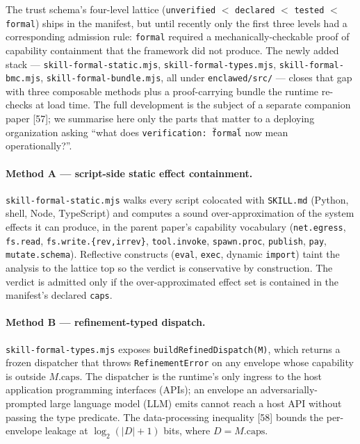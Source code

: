 \documentclass[11pt]{article}
\begin{document}
The trust schema's four-level lattice
(\texttt{unverified} $<$ \texttt{declared} $<$ \texttt{tested} $<$
\texttt{formal}) ships in the manifest, but until recently only the
first three levels had a corresponding admission rule: \texttt{formal}
required a mechanically-checkable proof of capability containment that
the framework did not produce. The newly added stack ---
\texttt{skill-formal-static.mjs},
\texttt{skill-formal-types.mjs},
\texttt{skill-formal-bmc.mjs},
\texttt{skill-formal-bundle.mjs}, all under \texttt{enclawed/src/}
--- closes that gap with three composable methods plus a
proof-carrying bundle the runtime re-checks at load time. The full development is the
subject of a separate companion paper [57]; we
summarise here only the parts that matter to a deploying organization
asking ``what does \texttt{verification: \"formal\"} now mean
operationally?''.

\paragraph{Method A --- script-side static effect containment.}
\texttt{skill-formal-static.mjs} walks every script colocated with
\texttt{SKILL.md} (Python, shell, Node, TypeScript) and computes a
sound over-approximation of the system effects it can produce, in the
parent paper's capability vocabulary
(\texttt{net.egress}, \texttt{fs.read}, \texttt{fs.write.\{rev,irrev\}},
\texttt{tool.invoke}, \texttt{spawn.proc}, \texttt{publish},
\texttt{pay}, \texttt{mutate.schema}). Reflective constructs
(\texttt{eval}, \texttt{exec}, dynamic \texttt{import}) taint the
analysis to the lattice top so the verdict is conservative by
construction. The verdict is admitted only if the over-approximated
effect set is contained in the manifest's declared \texttt{caps}.

\paragraph{Method B --- refinement-typed dispatch.}
\texttt{skill-formal-types.mjs} exposes \texttt{buildRefinedDispatch(M)},
which returns a frozen dispatcher that throws \texttt{RefinementError}
on any envelope whose capability is outside $M.\mathrm{caps}$. The
dispatcher is the runtime's only ingress to the host application
programming interfaces (APIs); an envelope an adversarially-prompted
large language model (LLM) emits cannot reach a host API without
passing the type predicate. The data-processing inequality
[58] bounds the per-envelope leakage at
$\log_2(\lvert D \rvert + 1)$ bits, where $D = M.\mathrm{caps}$.
\end{document}
